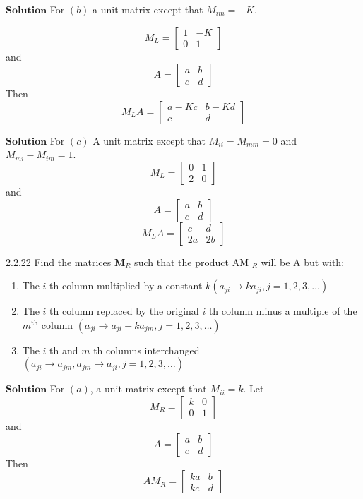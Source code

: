 \documentclass{article}
\begin{document}
\begin{flushleft}
$\boxed{\textbf{Solution}}$ For $(b)$ a unit matrix except that $M_{i m}=-K$.

$$M_{L}=\left[\begin{array}{cc}1 & -K \\ 0 & 1\end{array}\right]$$
and 
$$A=\left[\begin{array}{ll}a & b \\ c & d\end{array}\right]$$
Then
$$
M_{L} A=\left[\begin{array}{cc}
a-K c & b-K d \\
c & d
\end{array}\right]
$$

$\boxed{\textbf{Solution}}$  For $(c)$ A unit matrix except that $M_{i i}=M_{m m}=0$ and $M_{m i}-M_{i m}=1$.
$$M_{L}=\left[\begin{array}{ll}0 & 1 \\ 2 & 0\end{array}\right]$$ 
and 
$$A=\left[\begin{array}{ll}a & b \\ c & d\end{array}\right]$$
$$
M_{L} A=\left[\begin{array}{cc}
c & d \\
2 a & 2 b
\end{array}\right]
$$



\newpage


\begin{mybox}{2.2.22}
Find the matrices $\mathbf{M}_{R}$ such that the product AM $_{R}$ will be A but with:

\begin{enumerate}[$(a)$]
\item The $i$ th column multiplied by a constant $k\left(a_{j i} \rightarrow k a_{j i}, j=1,2,3, \ldots\right)$
\item The $i$ th column replaced by the original $i$ th column minus a multiple of the $m^{\text{th}}$ column $\left(a_{j i} \rightarrow a_{j i}-k a_{j m}, j=1,2,3, \ldots\right)$
\item The $i$ th and $m$ th columns interchanged $\left(a_{j i} \rightarrow a_{j m}, a_{j m} \rightarrow a_{j i}, j=1,2,3, \ldots\right)$
\end{enumerate}
\end{mybox}


$\boxed{\textbf{Solution}}$  For $(a)$, a unit matrix except that $M_{i i}=k$. Let 
$$M_{R}=\left[\begin{array}{ll}k & 0 \\ 0 & 1\end{array}\right]$$ 
and 
$$A=\left[\begin{array}{ll}a & b \\ c & d\end{array}\right]$$
Then 
$$A M_{R}=\left[\begin{array}{ll}k a & b \\ k c & d\end{array}\right]$$


\end{flushleft}
\end{document}

